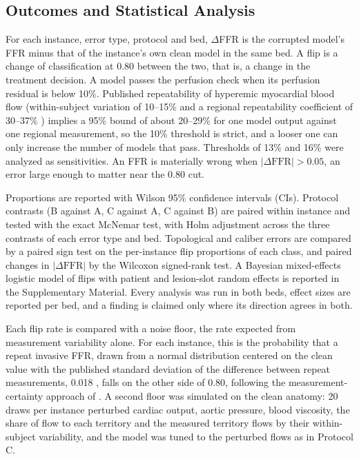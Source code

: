 \documentclass[journal]{IEEEtran}
\begin{document}
\subsection{Outcomes and Statistical Analysis}
For each instance, error type, protocol and bed, $\Delta$FFR is the corrupted model's FFR minus that of the
instance's own clean model in the same bed. A flip is a change of classification at 0.80 between the two, that is,
a change in the treatment decision. A model passes the perfusion check when its perfusion residual is below 10\%.
Published repeatability of hyperemic myocardial blood flow (within-subject variation of 10--15\%
\cite{schindler2023} and a regional repeatability coefficient of 30--37\% \cite{brown2018}) implies a 95\% bound of
about 20--29\% for one model output against one regional measurement, so the 10\% threshold is strict, and a looser
one can only increase the number of models that pass. Thresholds of 13\% and 16\% were analyzed as
sensitivities. An FFR is materially wrong when $|\Delta\mathrm{FFR}| > 0.05$, an error large enough to matter near
the 0.80 cut.

Proportions are reported with Wilson 95\% confidence intervals (CIs). Protocol contrasts (B against A, C against A,
C against B) are paired within instance and tested with the exact McNemar test, with Holm adjustment across the
three contrasts of each error type and bed. Topological and caliber errors are compared by a paired sign test on
the per-instance flip proportions of each class, and paired changes in $|\Delta\mathrm{FFR}|$ by the Wilcoxon
signed-rank test. A Bayesian mixed-effects logistic model of flips with patient and lesion-slot random effects is reported in the
Supplementary Material. Every analysis was run in both beds, effect sizes are reported per bed, and a finding is
claimed only where its direction agrees in both.

Each flip rate is compared with a noise floor, the rate expected from measurement variability alone. For each instance, this is the probability that a repeat invasive FFR, drawn from a normal
distribution centered on the clean value with the published standard deviation of the difference between repeat measurements, 0.018 \cite{johnson2015}, falls on the other side of 0.80, following the measurement-certainty approach of \cite{petraco2013}. A second floor was simulated on the clean anatomy: 20 draws
per instance perturbed cardiac output, aortic pressure, blood viscosity, the share of flow to each territory and the
measured territory flows by their within-subject variability, and the model was tuned to the perturbed flows as in
Protocol C.
\end{document}
